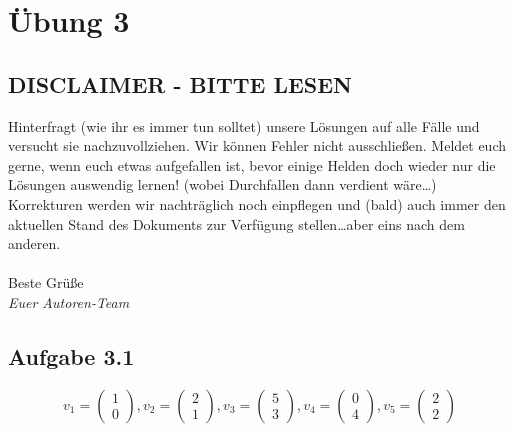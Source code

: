 \documentclass{standalone}
\begin{document}
\section{Übung 3}

\subsection{DISCLAIMER - BITTE LESEN}
Hinterfragt (wie ihr es immer tun solltet) unsere Lösungen auf alle Fälle und versucht sie nachzuvollziehen. 
Wir können Fehler nicht ausschließen. Meldet euch gerne, wenn euch etwas aufgefallen ist, bevor einige Helden doch wieder nur die Lösungen auswendig lernen! (wobei Durchfallen dann verdient wäre\dots)
Korrekturen werden wir nachträglich noch einpflegen und (bald) auch immer den aktuellen Stand des Dokuments zur Verfügung stellen\dots aber eins nach dem anderen.
\\ \\
Beste Grüße \\
\textit{Euer Autoren-Team}

\subsection{Aufgabe 3.1}

$$
    v_1 = \begin{pmatrix} 1 \\ 0 \end{pmatrix},
    v_2 = \begin{pmatrix} 2 \\ 1 \end{pmatrix},
    v_3 = \begin{pmatrix} 5 \\ 3 \end{pmatrix},
    v_4 = \begin{pmatrix} 0 \\ 4 \end{pmatrix},
    v_5 = \begin{pmatrix} 2 \\2  \end{pmatrix}
$$
\end{document}
